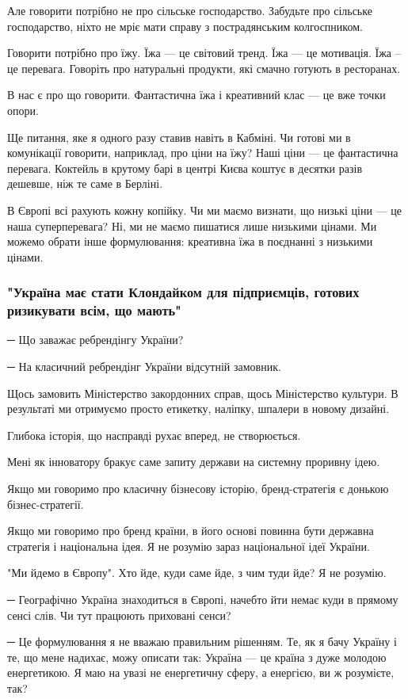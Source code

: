 Але говорити потрібно не про сільське господарство. Забудьте про сільське
господарство, ніхто не мріє мати справу з пострадянським колгоспником. 

Говорити потрібно про їжу. Їжа --- це світовий тренд. Їжа --- це мотивація. Їжа –
це перевага. Говоріть про натуральні продукти, які смачно готують в ресторанах. 

В нас є про що говорити. Фантастична їжа і креативний клас --- це вже точки
опори.

Ще питання, яке я одного разу ставив навіть в Кабміні. Чи готові ми в
комунікації говорити, наприклад, про ціни на їжу? Наші ціни --- це фантастична
перевага. Коктейль в крутому барі в центрі Києва коштує в десятки разів
дешевше, ніж те саме в Берліні.

В Європі всі рахують кожну копійку. Чи ми маємо визнати, що низькі ціни --- це
наша суперперевага? Ні, ми не маємо пишатися лише низькими цінами. Ми можемо
обрати інше формулювання: креативна їжа в поєднанні з низькими цінами.

\subsubsection{"Україна має стати Клондайком для підприємців, готових ризикувати всім, що мають"}

─ Що заважає ребрендінгу України?

─ На класичний ребрендінг України відсутній замовник.

Щось замовить Міністерство закордонних справ, щось Міністерство культури. В
результаті ми отримуємо просто етикетку, наліпку, шпалери в новому дизайні.

Глибока історія, що насправді рухає вперед, не створюється.

Мені як інноватору бракує саме запиту держави на системну проривну ідею.

Якщо ми говоримо про класичну бізнесову історію, бренд-стратегія є донькою
бізнес-стратегії. 

Якщо ми говоримо про бренд країни, в його основі повинна бути державна
стратегія і національна ідея. Я не розумію зараз національної ідеї України.

"Ми йдемо в Європу". Хто йде, куди саме йде, з чим туди йде? Я не розумію.

─ Географічно Україна знаходиться в Європі, начебто йти немає куди в прямому
сенсі слів. Чи тут працюють приховані сенси?

─ Це формулювання я не вважаю правильним рішенням. Те, як я бачу Україну і те,
що мене надихає, можу описати так: Україна --- це країна з дуже молодою
енергетикою. Я маю на увазі не енергетичну сферу, а енергією, ви ж розумієте,
так? 

